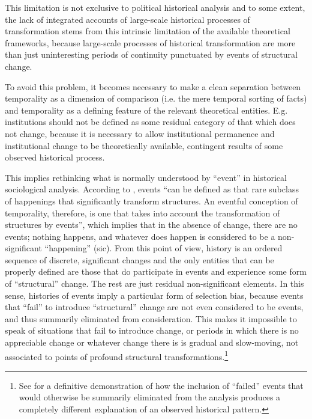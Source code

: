 This limitation is not exclusive to political historical analysis and to some extent, the lack of integrated accounts of large-scale historical processes of transformation stems from this intrinsic limitation of the available theoretical frameworks, because large-scale processes of historical transformation are more than just uninteresting periods of continuity punctuated by events of structural change.

To avoid this problem, it becomes necessary to make a clean separation between temporality as a dimension of comparison (i.e. the mere temporal sorting of facts) and temporality as a defining feature of the relevant theoretical entities. E.g. institutions should not be defined as some residual category of that which does not change, because it is necessary to allow institutional permanence and institutional change to be theoretically available, contingent results of some observed historical process.

This implies rethinking what is normally understood by ``event'' in historical sociological analysis.
According to \citet{sewell1992,sewell1996}, events ``can be defined as that rare subclass of happenings that significantly transform structures. An eventful conception of temporality, therefore, is one that takes into account the transformation of structures by events'', which implies that in the absence of change, there are no events; nothing happens, and whatever does happen is considered to be a non-significant ``happening'' (sic).
From this point of view, history is an ordered sequence of discrete, significant changes and the only entities that can be properly defined are those that do participate in events and experience some form of ``structural'' change.
The rest are just residual non-significant elements.
In this sense, histories of events imply a particular form of selection bias, because events that ``fail'' to introduce ``structural'' change are not even considered to be events, and thus summarily eliminated from consideration.
This makes it impossible to speak of situations that fail to introduce change, or periods in which there is no appreciable change or whatever change there is is gradual and slow-moving, not associated to points of profound structural transformations.\footnote{
    See \cite{hagen2013,makovi2016} for a definitive demonstration of how the inclusion of ``failed'' events that would otherwise be summarily eliminated from the analysis produces a completely different explanation of an observed historical pattern.
}

